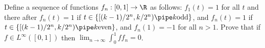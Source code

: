 Define a sequence of functions $f_n:[0,1]\rightarrow \R$ as follows:
$f_1(t)=1$ for all $t$ and there after $f_n(t)=1$ if $t\in
\{[(k-1)/2^n,k/2^n) \pipe k \text{odd}\}$, and $f_n(t)=1$ if $t\in
\{[(k-1)/2^n,k/2^n) \pipe k \text{even}\}$, and $f_{n}(1)=-1$ for all
$n>1$. Prove that if $f\in L^{\infty}([0,1])$ then $\lim_{n\rightarrow
\infty}\int_0^1 f f_n=0$.
